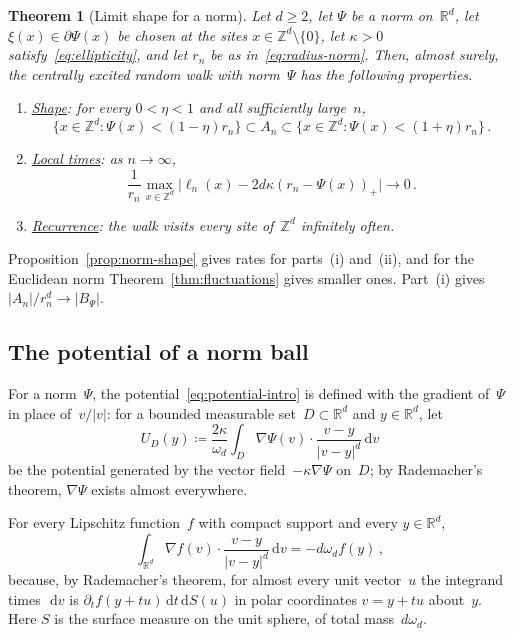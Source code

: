\documentclass[11pt]{amsart}
\theoremstyle{plain}
\newtheorem{theorem}{Theorem}[section]
\theoremstyle{definition}
\newcommand{\Z}{\mathbb Z}
\newcommand{\R}{\mathbb R}
\newcommand{\drift}{\kappa}
\newcommand{\gauge}{\Psi}
\newcommand{\dd}{\,\mathrm d}
\numberwithin{equation}{section}
\begin{document}
\begin{theorem}[Limit shape for a norm]\label{thm:norm-shape}
Let $d\geq2$, let $\gauge$ be a norm on~$\R^d$, let $\xi(x)\in\partial \gauge(x)$ be chosen at the sites $x\in\Z^d\setminus\{0\}$, let $\drift>0$ satisfy~\eqref{eq:ellipticity}, and let $r_n$ be as in~\eqref{eq:radius-norm}. Then, almost surely, the centrally excited random walk with norm~$\gauge$ has the following properties.
\begin{enumerate}[label=\textup{(\roman*)}]
\item \underline{\emph{Shape}}: for every $0<\eta<1$ and all sufficiently large~$n$,
\begin{equation*}
\{x\in\Z^d:\gauge(x)<(1-\eta)r_n\}\subset A_n\subset\{x\in\Z^d:\gauge(x)<(1+\eta)r_n\}\, .
\end{equation*}
\item \underline{\emph{Local times}}: as $n\to\infty$,
\begin{equation*}
\frac1{r_n}\max_{x\in\Z^d}\bigl|\ell_n(x)-2d\drift(r_n-\gauge(x))_+\bigr|\longrightarrow0\, .
\end{equation*}
\item \underline{\emph{Recurrence}}: the walk visits every site of~$\Z^d$ infinitely often.
\end{enumerate}
\end{theorem}

Proposition~\ref{prop:norm-shape} gives rates for parts~(i) and~(ii), and for the Euclidean norm Theorem~\ref{thm:fluctuations} gives smaller ones. Part~(i) gives $|A_n|/r_n^d\to|B_\gauge|$.

\subsection{The potential of a norm ball}\label{sec:ballpotential}

For a norm~$\gauge$, the potential~\eqref{eq:potential-intro} is defined with the gradient of~$\gauge$ in place of~$v/|v|$: for a bounded measurable set~$D\subset\R^d$ and $y\in\R^d$, let
\begin{equation}\label{eq:potential-norm}
U_D(y)\coloneqq\frac{2\drift}{\omega_d}\int_D\nabla\gauge(v)\cdot\frac{v-y}{|v-y|^d}\dd v
\end{equation}
be the potential generated by the vector field~$-\drift\nabla\gauge$ on~$D$; by Rademacher's theorem, $\nabla\gauge$ exists almost everywhere.

For every Lipschitz function~$f$ with compact support and every $y\in\R^d$,
\begin{equation}\label{eq:gradient-identity}
\int_{\R^d}\nabla f(v)\cdot\frac{v-y}{|v-y|^d}\dd v=-d\omega_df(y)\, ,
\end{equation}
because, by Rademacher's theorem, for almost every unit vector~$u$ the integrand times~$\dd v$ is $\partial_tf(y+tu)\dd t\dd S(u)$ in polar coordinates $v=y+tu$ about~$y$. Here $S$ is the surface measure on the unit sphere, of total mass~$d\omega_d$.
\end{document}
